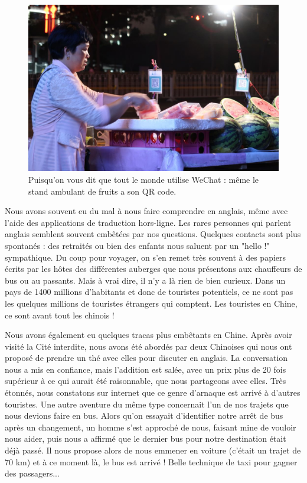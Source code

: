 \begin{figure}
\centering
\includegraphics{images/20180622_wechat.JPG}
\caption{Puisqu'on vous dit que tout le monde utilise WeChat : même le
stand ambulant de fruits a son QR code.}
\end{figure}

Nous avons souvent eu du mal à nous faire comprendre en anglais, même
avec l'aide des applications de traduction hors-ligne. Les rares
personnes qui parlent anglais semblent souvent embêtées par nos
questions. Quelques contacts sont plus spontanés : des retraités ou bien
des enfants nous saluent par un "hello !" sympathique. Du coup pour
voyager, on s'en remet très souvent à des papiers écrits par les hôtes
des différentes auberges que nous présentons aux chauffeurs de bus ou au
passants. Mais à vrai dire, il n'y a là rien de bien curieux. Dans un
pays de 1400 millions d'habitants et donc de touristes potentiels, ce ne
sont pas les quelques millions de touristes étrangers qui comptent. Les
touristes en Chine, ce sont avant tout les chinois !

Nous avons également eu quelques tracas plus embêtants en Chine. Après
avoir visité la Cité interdite, nous avons été abordés par deux
Chinoises qui nous ont proposé de prendre un thé avec elles pour
discuter en anglais. La conversation nous a mis en confiance, mais
l'addition est salée, avec un prix plus de 20 fois supérieur à ce qui
aurait été raisonnable, que nous partageons avec elles. Très étonnés,
nous constatons sur internet que ce genre d'arnaque est arrivé à
d'autres touristes. Une autre aventure du même type concernait l'un de
nos trajets que nous devions faire en bus. Alors qu'on essayait
d'identifier notre arrêt de bus après un changement, un homme s'est
approché de nous, faisant mine de vouloir nous aider, puis nous a
affirmé que le dernier bus pour notre destination était déjà passé. Il
nous propose alors de nous emmener en voiture (c'était un trajet de 70
km) et à ce moment là, le bus est arrivé ! Belle technique de taxi pour
gagner des passagers...


